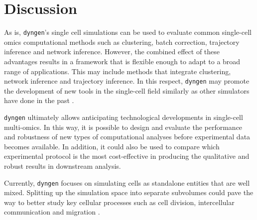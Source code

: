 \section{Discussion}
As is, \texttt{dyngen}'s single cell simulations can be used to evaluate common single-cell omics computational methods such as clustering, batch correction, trajectory inference and network inference.
However, the combined effect of these advantages results in a framework that is flexible enough to adapt to a broad range of applications. This may include methods that integrate clustering, network inference and trajectory inference. In this respect, \texttt{dyngen} may promote the development of new tools in the single-cell field similarly as other simulators have done in the past \cite{schaffter_genenetweaversilicobenchmark_2011,ewing_combiningtumorgenome_2015}.

\texttt{dyngen} ultimately allows anticipating technological developments in single-cell multi-omics. In this way, it is possible to design and evaluate the performance and robustness of new types of computational analyses before experimental data becomes available.
In addition, it could also be used to compare which experimental protocol is the most cost-effective in producing the qualitative and robust results in downstream analysis.

Currently, \texttt{dyngen} focuses on simulating cells as standalone entities that are well mixed.
Splitting up the simulation space into separate subvolumes could pave the way to better study key cellular processes such as cell division, intercellular communication and migration \cite{smith_spatialstochasticintracellular_2019}.





